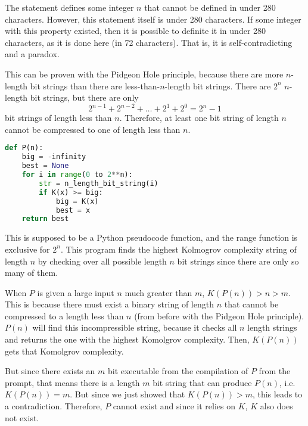 \documentclass[11pt]{article}
\begin{document}
\begin{solution}

\begin{Parts}
\Part The statement defines some integer $n$ that cannot be defined in under 280
characters. However, this statement itself is under 280 characters. If some integer
with this property existed, then it is possible to definite it in under 280 
characters, as it is done here (in 72 characters). That is, it is self-contradicting
and a paradox.

\Part This can be proven with the Pidgeon Hole principle, because there are more
$n$-length bit strings than there are less-than-$n$-length bit strings. There are
$2^n$ $n$-length bit strings, but there are only 
\[
    2^{n-1} +2^{n-2} + \dots + 2^1 + 2^0 = 2^n-1
\]
bit strings of length less than $n$. Therefore, at least one bit string of length
$n$ cannot be compressed to one of length less than $n$.

\Part 

\begin{lstlisting}[language=Python]
def P(n):
    big = -infinity
    best = None
    for i in range(0 to 2**n):
        str = n_length_bit_string(i)
        if K(x) >= big:
            big = K(x)
            best = x 
    return best
\end{lstlisting}

This is supposed to be a Python pseudocode function, and the range function is exclusive for $2^n$.
This program finds the highest Kolmogrov complexity string of length $n$ by checking
over all possible length $n$ bit strings since there are only so many of them. 

\Part When $P$ is given a large input $n$ much greater than $m$, $K(P(n)) > n > m$.
This is because there must exist a binary string of length $n$ that cannot be compressed
to a length less than $n$ (from before with the Pidgeon Hole principle). $P(n)$ will 
find this incompressible string, because it checks all $n$ length strings and returns
the one with the highest Komolgrov complexity. Then, $K(P(n))$ gets that Komolgrov
complexity. 

But since
there exists an $m$ bit executable from the compilation of $P$ from the prompt, that means
there is a length $m$ bit string that can produce $P(n)$, i.e. $K(P(n)) = m$. But since
we just showed that $K(P(n)) > m$, this leads to a contradiction. Therefore, $P$ cannot
exist and since it relies on $K$, $K$ also does not exist. 

\end{Parts}

\end{solution}
\end{document}
